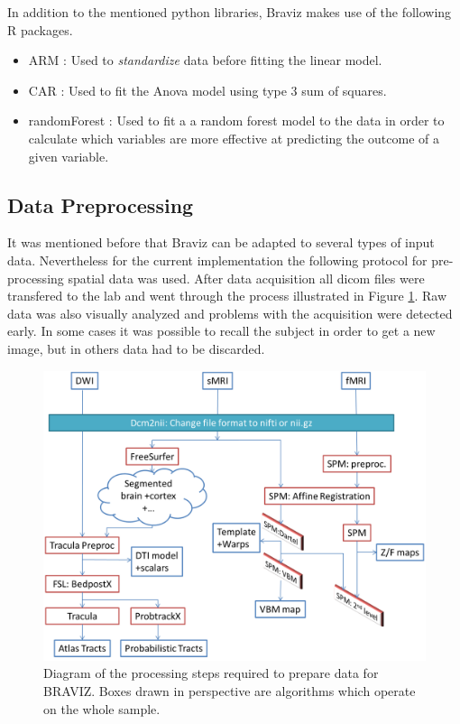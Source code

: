 In addition to the mentioned python libraries, Braviz makes use of the following R packages.

\begin{itemize}
\item ARM \autocite{gelman_arm:_2015}: Used to \emph{standardize} data before fitting the linear model.
\item CAR \autocite{fox_car:_2015}: Used to fit the Anova model using type 3 sum of squares.
\item randomForest \autocite{cutler_randomforest:_2014}: Used to fit a a random forest model to the data in order to calculate which variables are more effective at predicting the outcome of a given variable.
\end{itemize}

\subsection{Data Preprocessing}
\label{sec_preproc}
It was mentioned before that Braviz can be adapted to several types of input data. Nevertheless for the current implementation the following protocol for pre-processing spatial data was used. After data acquisition all dicom files were transfered to the lab and went through the process illustrated in Figure \ref{fig_data_proc}. Raw data was also visually analyzed and problems with the acquisition were detected early. In some cases it was possible to recall the subject in order to get a new image, but in others data had to be discarded.

\begin{figure}
\includegraphics[width=\textwidth]{figures/flujo}
\caption{\label{fig_data_proc}  Diagram of the processing steps required to prepare data for BRAVIZ. Boxes drawn in perspective are algorithms which operate on the whole sample.}
\end{figure}

